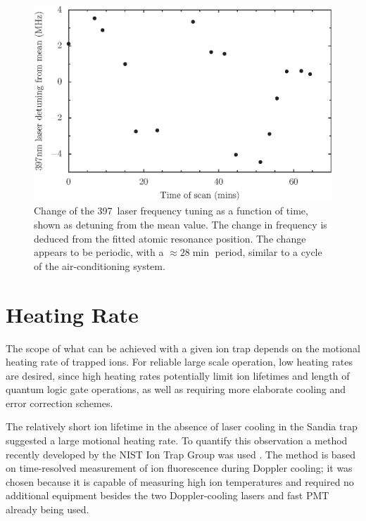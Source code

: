 \begin{figure}[h!t]
\centering
\includegraphics[width=12.5cm]{chapter7/saturation/397detuning_v3}
\caption[Change of 397\nm\, laser frequency versus time]{Change of the 397\nm\, laser frequency tuning as a function of time, shown as detuning from the mean value. The change in frequency is deduced from the fitted atomic resonance position. The change appears to be periodic, with a $\approx28\min$ period, similar to a cycle of the air-conditioning system.}
\label{fig:397resonancepos}
\end{figure} 


\section{Heating Rate}

The scope of what can be achieved with a given ion trap depends on the motional heating rate of trapped ions. For reliable large scale operation, low heating rates are desired, since high heating rates potentially limit ion lifetimes and length of quantum logic gate operations, as well as requiring more elaborate cooling and error correction schemes.

The relatively short ion lifetime in the absence of laser cooling in the Sandia trap suggested a large motional heating rate. To quantify this observation a method recently developed by the NIST Ion Trap Group was used \cite{Wesenberg2007}. The method is based on time-resolved measurement of ion fluorescence during Doppler cooling; it was chosen because it is capable of measuring high ion temperatures and required no additional equipment besides the two Doppler-cooling lasers and fast PMT already being used. 

